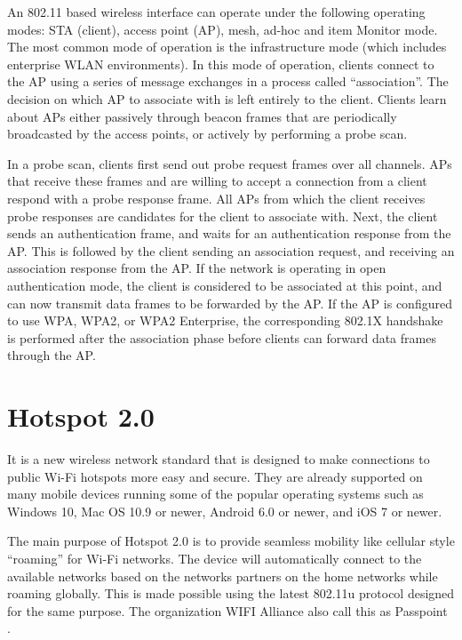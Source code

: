 An 802.11 based wireless interface can operate under the following operating modes: STA (client), access point (AP), mesh, ad-hoc and item Monitor mode. The most common mode of operation is the infrastructure mode (which includes enterprise WLAN environments). In this mode of operation, clients connect to the AP using a series of message exchanges in a process called “association”. The decision on which AP to associate with is left entirely to the client. Clients learn about APs either passively through beacon frames that are periodically broadcasted by the access points, or actively by performing a probe scan. 

In a probe scan, clients first send out probe request frames over all channels. APs that receive these frames and are willing to accept a connection from a client respond with a probe response frame. All APs from which the client receives probe responses are candidates for the client to associate with. Next, the client sends an authentication frame, and waits for an authentication response from the AP. This is followed by the client sending an association request, and receiving an association response from the AP. If the network is operating in open authentication mode, the client is considered to be
associated at this point, and can now transmit data frames to be forwarded by the AP. If the AP is configured to use WPA, WPA2, or WPA2 Enterprise, the corresponding 802.1X \cite{hostapd} handshake is performed after the association phase before clients can forward data frames through the AP.


\section{Hotspot 2.0 \cite{Hotspot_2.0_Definition}} \label{Hotspot2.0}

It is a new wireless network standard that is designed to make connections to public Wi-Fi hotspots more easy and secure. They are already supported on many mobile devices running some of the popular operating systems such as Windows 10, Mac OS 10.9 or newer, Android 6.0 or newer, and iOS 7 or newer.

The main purpose of Hotspot 2.0 is to provide seamless mobility like cellular style “roaming” for Wi-Fi networks. The device will automatically connect to the available networks based on the networks partners on the home networks while roaming globally. This is made possible using the latest 802.11u \cite{IEEE802.11u} protocol designed for the same purpose. The organization WIFI Alliance also call this as Passpoint \cite{Passpoint}.